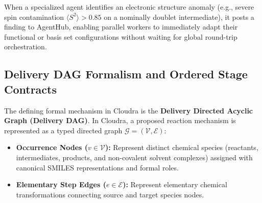 \documentclass[10pt,twocolumn,letterpaper]{article}
\begin{document}
When a specialized agent identifies an electronic structure anomaly (e.g., severe spin contamination $\langle S^2 \rangle > 0.85$ on a nominally doublet intermediate), it posts a finding to AgentHub, enabling parallel workers to immediately adapt their functional or basis set configurations without waiting for global round-trip orchestration.

\subsection{Delivery DAG Formalism and Ordered Stage Contracts}
The defining formal mechanism in Cloudra is the \textbf{Delivery Directed Acyclic Graph (Delivery DAG)}. In Cloudra, a proposed reaction mechanism is represented as a typed directed graph $\mathcal{G} = (\mathcal{V}, \mathcal{E})$:
\begin{itemize}[leftmargin=*]
\item \textbf{Occurrence Nodes ($v \in \mathcal{V}$):} Represent distinct chemical species (reactants, intermediates, products, and non-covalent solvent complexes) assigned with canonical SMILES representations and formal roles.
\item \textbf{Elementary Step Edges ($e \in \mathcal{E}$):} Represent elementary chemical transformations connecting source and target species nodes.
\end{itemize}
\end{document}
